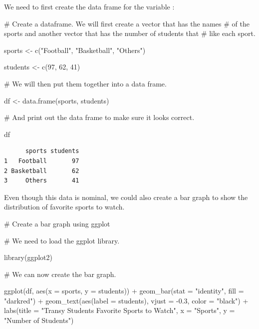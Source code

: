 \documentclass[
  letterpaper,
  DIV=11,
  numbers=noendperiod]{scrreprt}
\newenvironment{Shaded}{\begin{snugshade}}{\end{snugshade}}
\newcommand{\AttributeTok}[1]{\textcolor[rgb]{0.40,0.45,0.13}{#1}}
\newcommand{\CommentTok}[1]{\textcolor[rgb]{0.37,0.37,0.37}{#1}}
\newcommand{\DecValTok}[1]{\textcolor[rgb]{0.68,0.00,0.00}{#1}}
\newcommand{\FloatTok}[1]{\textcolor[rgb]{0.68,0.00,0.00}{#1}}
\newcommand{\FunctionTok}[1]{\textcolor[rgb]{0.28,0.35,0.67}{#1}}
\newcommand{\NormalTok}[1]{\textcolor[rgb]{0.00,0.23,0.31}{#1}}
\newcommand{\OtherTok}[1]{\textcolor[rgb]{0.00,0.23,0.31}{#1}}
\newcommand{\SpecialCharTok}[1]{\textcolor[rgb]{0.37,0.37,0.37}{#1}}
\newcommand{\StringTok}[1]{\textcolor[rgb]{0.13,0.47,0.30}{#1}}
\begin{document}
We need to first create the data frame for the variable :

\begin{Shaded}
\begin{Highlighting}[]
\CommentTok{\# Create a dataframe. We will first create a vector that has the names}
\CommentTok{\# of the sports and another vector that has the number of students that}
\CommentTok{\# like each sport.}

\NormalTok{sports }\OtherTok{\textless{}{-}} \FunctionTok{c}\NormalTok{(}\StringTok{"Football"}\NormalTok{, }\StringTok{"Basketball"}\NormalTok{, }\StringTok{"Others"}\NormalTok{)}

\NormalTok{students }\OtherTok{\textless{}{-}} \FunctionTok{c}\NormalTok{(}\DecValTok{97}\NormalTok{, }\DecValTok{62}\NormalTok{, }\DecValTok{41}\NormalTok{)}

\CommentTok{\# We will then put them together into a data frame.}

\NormalTok{df }\OtherTok{\textless{}{-}} \FunctionTok{data.frame}\NormalTok{(sports, students)}

\CommentTok{\# And print out the data frame to make sure it looks correct.}

\NormalTok{df}
\end{Highlighting}
\end{Shaded}

\begin{verbatim}
      sports students
1   Football       97
2 Basketball       62
3     Others       41
\end{verbatim}

Even though this data is nominal, we could also create a bar graph to
show the distribution of favorite sports to watch.

\begin{Shaded}
\begin{Highlighting}[]
\CommentTok{\# Create a bar graph using ggplot}

\CommentTok{\# We need to load the ggplot library.}

\FunctionTok{library}\NormalTok{(ggplot2)}

\CommentTok{\# We can now create the bar graph.}

\FunctionTok{ggplot}\NormalTok{(df, }\FunctionTok{aes}\NormalTok{(}\AttributeTok{x =}\NormalTok{ sports, }\AttributeTok{y =}\NormalTok{ students)) }\SpecialCharTok{+} 
  \FunctionTok{geom\_bar}\NormalTok{(}\AttributeTok{stat =} \StringTok{"identity"}\NormalTok{, }\AttributeTok{fill =} \StringTok{"darkred"}\NormalTok{) }\SpecialCharTok{+}
  \FunctionTok{geom\_text}\NormalTok{(}\FunctionTok{aes}\NormalTok{(}\AttributeTok{label =}\NormalTok{ students), }\AttributeTok{vjust =} \SpecialCharTok{{-}}\FloatTok{0.3}\NormalTok{, }\AttributeTok{color =} \StringTok{"black"}\NormalTok{) }\SpecialCharTok{+}
  \FunctionTok{labs}\NormalTok{(}\AttributeTok{title =} \StringTok{"Transy Students Favorite Sports to Watch"}\NormalTok{, }
       \AttributeTok{x =} \StringTok{"Sports"}\NormalTok{, }\AttributeTok{y =} \StringTok{"Number of Students"}\NormalTok{)}
\end{Highlighting}
\end{Shaded}
\end{document}
